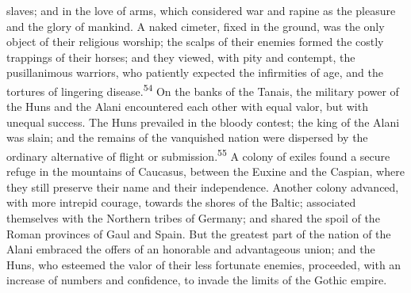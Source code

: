 slaves; and in the love of arms, which considered war and rapine
as the pleasure and the glory of mankind. A naked cimeter, fixed
in the ground, was the only object of their religious worship;
the scalps of their enemies formed the costly trappings of their
horses; and they viewed, with pity and contempt, the
pusillanimous warriors, who patiently expected the infirmities of
age, and the tortures of lingering disease.\textsuperscript{54} On the banks of
the Tanais, the military power of the Huns and the Alani
encountered each other with equal valor, but with unequal
success. The Huns prevailed in the bloody contest; the king of
the Alani was slain; and the remains of the vanquished nation
were dispersed by the ordinary alternative of flight or
submission.\textsuperscript{55} A colony of exiles found a secure refuge in the
mountains of Caucasus, between the Euxine and the Caspian, where
they still preserve their name and their independence. Another
colony advanced, with more intrepid courage, towards the shores
of the Baltic; associated themselves with the Northern tribes of
Germany; and shared the spoil of the Roman provinces of Gaul and
Spain. But the greatest part of the nation of the Alani embraced
the offers of an honorable and advantageous union; and the Huns,
who esteemed the valor of their less fortunate enemies,
proceeded, with an increase of numbers and confidence, to invade
the limits of the Gothic empire.




